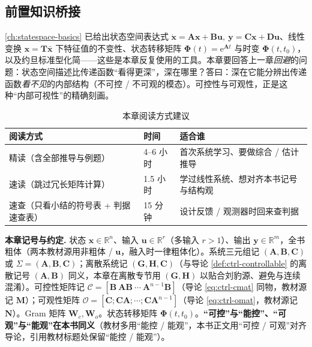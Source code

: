 \subsection*{前置知识桥接}
\cref{ch:statespace-basics} 已给出状态空间表达式 $\dot{\mathbf{x}}=\mathbf{A}\mathbf{x}+\mathbf{B}\mathbf{u},\ \mathbf{y}=\mathbf{C}\mathbf{x}+\mathbf{D}\mathbf{u}$、线性变换 $\mathbf{x}=\mathbf{T}\bar{\mathbf{x}}$ 下特征值的不变性、状态转移矩阵 $\boldsymbol{\Phi}(t)=\mathrm{e}^{\mathbf{A}t}$ 与时变 $\boldsymbol{\Phi}(t,t_0)$，以及约旦标准型化简——这些是本章反复使用的工具。本章要回答上一章\emph{回避}的问题：状态空间描述比传递函数“看得更深”，深在哪里？答曰：深在它能分辨出传递函数\emph{看不见}的内部结构（不可控 / 不可观的模态）。可控性与可观性，正是这种“内部可视性”的精确刻画。

\begin{table}[H]\centering\small
\caption{本章阅读方式建议}
\begin{tabular}{lll}
\toprule
阅读方式 & 时间 & 适合谁 \\
\midrule
精读（含全部推导与例题） & 4--6 小时 & 首次系统学习、要做综合 / 估计推导 \\
速读（跳过冗长矩阵计算） & 1.5 小时 & 学过线性系统、想对齐本书记号与结构观 \\
速查（只看小结的符号表 + 判据速查表） & 15 分钟 & 设计反馈 / 观测器时回来查判据 \\
\bottomrule
\end{tabular}
\end{table}

\begin{note}
\textbf{本章记号与约定.}\;
状态 $\mathbf{x}\in\mathbb{R}^n$、输入 $\mathbf{u}\in\mathbb{R}^r$（多输入 $r>1$）、输出 $\mathbf{y}\in\mathbb{R}^m$，全书粗体（两本教材源用非粗体 / $\boldsymbol{u}$，融入时一律粗体化）。系统三元组记 $(\mathbf{A},\mathbf{B},\mathbf{C})$ 或 $\Sigma=(\mathbf{A},\mathbf{B},\mathbf{C})$；离散系统记 $(\mathbf{G},\mathbf{H},\mathbf{C})$（与导论 \cref{def:ctrl-controllable} 的离散记号 $(\mathbf{A},\mathbf{B})$ 同义，本章在离散专节用 $(\mathbf{G},\mathbf{H})$ 以贴合刘豹源、避免与连续混淆）。可控性矩阵记 $\mathcal{C}=[\mathbf{B}\ \mathbf{A}\mathbf{B}\ \cdots\ \mathbf{A}^{n-1}\mathbf{B}]$（导论 \cref{eq:ctrl-cmat} 同物，教材源记 $\mathbf{M}$）；可观性矩阵 $\mathcal{O}=[\mathbf{C};\mathbf{C}\mathbf{A};\cdots;\mathbf{C}\mathbf{A}^{n-1}]$（导论 \cref{eq:ctrl-omat}，教材源记 $\mathbf{N}$）。Gram 矩阵 $\mathbf{W}_c,\mathbf{W}_o$。状态转移矩阵 $\boldsymbol{\Phi}(t,t_0)$。\textbf{“可控”与“能控”、“可观”与“能观”在本书同义}（教材多用“能控 / 能观”，本书正文用“可控 / 可观”对齐导论，引用教材标题处保留“能控 / 能观”）。
\end{note}

